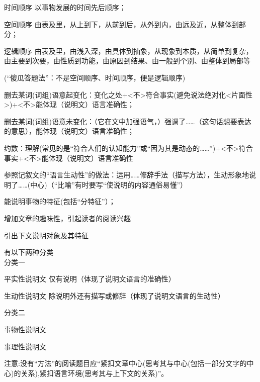 \begin{compactdesc}
\item[时间顺序]以事物发展的时间先后顺序；
\item[空间顺序]由表及里，从上到下，从前到后，从外到内，由远及近，从整体到部分；
\item[逻辑顺序]由表及里，由浅入深，由具体到抽象，从现象到本质，从简单到复杂，由主要到次要，由性质到功能，由原因到结果、由一般到个别、由整体到局部等
\end{compactdesc}
(``傻瓜答题法''：不是空间顺序、时间顺序，便是逻辑顺序)

\begin{asparaenum}[(1)]
\item 删去某词(词组)语意起变化：变化之处+<不>符合事实(避免说法绝对化<片面性>)+<不>能体现（说明文）语言准确性；
\item 删去某词(词组)语意未变化：（它在文中加强语气，）强调了\ldots{}\ldots{}（这句话想要表达的意思），能体现（说明文）语言准确性；
\item 约数：理解(常见的是``符合人们的认知能力''或``因为其是动态的\ldots{}\ldots{}'')+<不>符合事实+<不>能体现（说明文）语言准确性
\end{asparaenum}
参照记叙文的``语言生动性''的做法：运用\ldots{}\ldots{}修辞手法（描写方法），生动形象地说明了\ldots{}\ldots{}(中心)（``比喻''有时要写``使说明的内容通俗易懂''）
\begin{asparaenum}[(1)]
\item 能说明事物的特征(包括``分特征''）；
\item 增加文章的趣味性，引起读者的阅读兴趣
\item 引出下文说明对象及其特征
\end{asparaenum}

有以下两种分类
\\分类一
\begin{compactdesc}
\item[平实性说明文]仅有说明（体现了说明文语言的准确性）
\item[生动性说明文]除说明外还有描写或修辞（体现了说明文语言的生动性）
\end{compactdesc}
分类二
\begin{compactdesc}
\item[事物性说明文]
\item[事理性说明文]
\end{compactdesc}

注意:没有``方法''的阅读题目应``紧扣文章中心(思考其与中心(包括一部分文字的中心)的关系),紧扣语言环境(思考其与上下文的关系)''。
\label{main} 